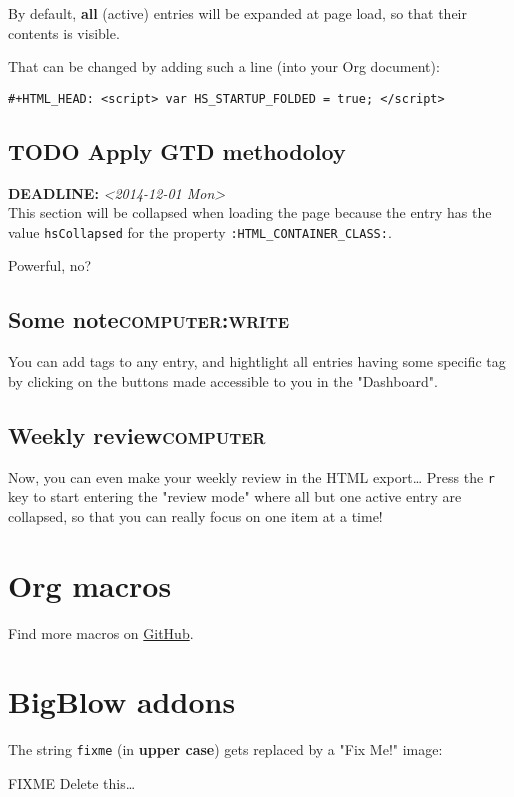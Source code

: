 \documentclass[11pt]{article}
\begin{document}
By default, \textbf{all} (active) entries will be expanded at page load, so that their
contents is visible.

That can be changed by adding such a line (into your Org document):

\begin{verbatim}
#+HTML_HEAD: <script> var HS_STARTUP_FOLDED = true; </script>
\end{verbatim}

\subsection*{{\bfseries\sffamily TODO} Apply GTD methodoloy}
\label{sec:org8e76fd8}
\noindent\textbf{DEADLINE:} \textit{<2014-12-01 Mon>}\\[0pt]
This section will be collapsed when loading the page because the entry has the
value \texttt{hsCollapsed} for the property \texttt{:HTML\_CONTAINER\_CLASS:}.

Powerful, no?

\subsection*{Some note\hfill{}\textsc{computer:write}}
\label{sec:orgbd033b0}

You can add tags to any entry, and hightlight all entries having some specific
tag by clicking on the buttons made accessible to you in the "Dashboard".

\subsection*{Weekly review\hfill{}\textsc{computer}}
\label{sec:org56fbb5d}

Now, you can even make your weekly review in the HTML export\ldots{} Press the \texttt{r} key
to start entering the "review mode" where all but one active entry are
collapsed, so that you can really focus on one item at a time!

\section*{Org macros}
\label{sec:orge8367f0}





Find more macros on \href{https://github.com/fniessen/org-macros}{GitHub}.

\section*{BigBlow addons}
\label{sec:org6b27c78}

The string \texttt{fixme} (in \textbf{upper case}) gets replaced by a "Fix Me!" image:

FIXME Delete this\ldots{}
\end{document}
